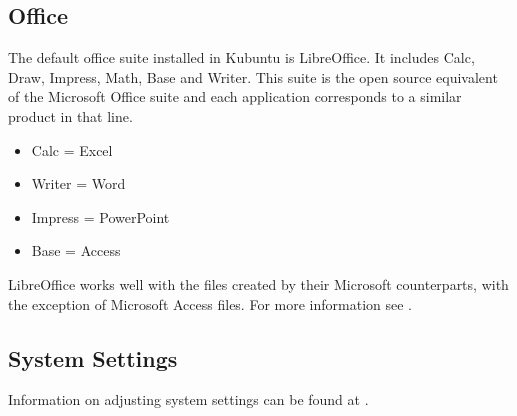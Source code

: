 \documentclass[letterpaper,10pt,english]{sphinxmanual}
\begin{document}
\subsection{Office}
\label{\detokenize{docs/software-management/software:office}}
\sphinxAtStartPar
The default office suite installed in Kubuntu is LibreOffice. It includes Calc, Draw, Impress, Math, Base and Writer. This suite is the open source equivalent of the Microsoft Office suite and each application corresponds to a similar product in that line.
\begin{itemize}
\item {} 
\sphinxAtStartPar
Calc = Excel

\item {} 
\sphinxAtStartPar
Writer = Word

\item {} 
\sphinxAtStartPar
Impress = PowerPoint

\item {} 
\sphinxAtStartPar
Base = Access

\end{itemize}

\sphinxAtStartPar
LibreOffice works well with the files created by their Microsoft counterparts, with the exception of Microsoft Access files. For more information see .


\subsection{System Settings}
\label{\detokenize{docs/software-management/software:system-settings}}
\sphinxAtStartPar
Information on adjusting system settings can be found at .
\end{document}
